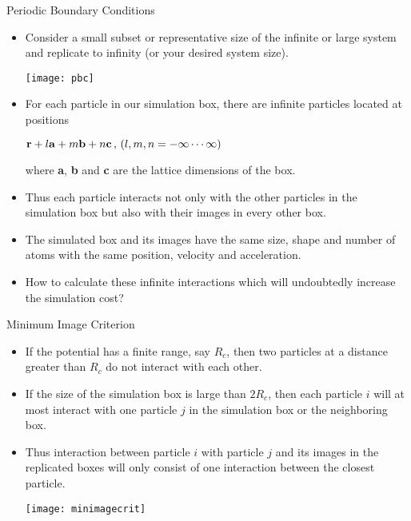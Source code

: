 \documentclass[slidestop,mathserif,compress,xcolor=svgnames]{beamer}
\newenvironment{bblock}[0]
{
\begin{beamerboxesrounded}[upper=uppercol1,lower=lowercol1,shadow=true]}
{\end{beamerboxesrounded}}
\begin{document}
\begin{frame}
  \begin{bblock}{Periodic Boundary Conditions}
    \begin{itemize}
    \item Consider a small subset or representative size of the infinite or large system and replicate to infinity (or your desired system size).
      \begin{center}
        \texttt{[image: pbc]}
      \end{center}
    \item For each particle in our simulation box, there are infinite particles located at positions
      \begin{center}
        ${\bf r} + l{\bf a} + m{\bf b} + n{\bf c}\, , \, (l,m,n=-\infty\cdots\infty)$
      \end{center}
      where {\bf a}, {\bf b} and {\bf c} are the lattice dimensions of the box.
    \item Thus each particle interacts not only with the other particles in the simulation box but also with their images in every other box.
    \item The simulated box and its images have the same size, shape and number of atoms with the same position, velocity and acceleration.
    \item How to calculate these infinite interactions which will undoubtedly increase the simulation cost?
    \end{itemize}
  \end{bblock}
\end{frame}

\begin{frame}
  \begin{bblock}{Minimum Image Criterion}
    \begin{itemize}
    \item If the potential has a finite range, say $R_c$, then two particles at a distance greater than $R_c$ do not interact with each other.
    \item If the size of the simulation box is large than $2R_c$, then each particle $i$ will at most interact with one particle $j$ in the simulation box or the neighboring box.
    \item Thus interaction between particle $i$ with particle $j$ and its images in the replicated boxes will only consist of one interaction between the closest particle.
      \begin{center}
        \texttt{[image: minimagecrit]}
      \end{center}
    \end{itemize}
  \end{bblock}
\end{frame}
\end{document}
